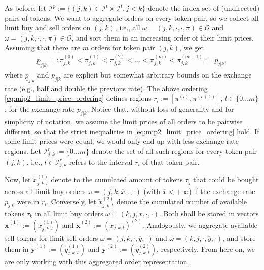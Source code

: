 \documentclass[11pt,parskip=full]{scrartcl}%
\newcommand*{\ie}{i.e., }
\newcommand*{\eg}{e.g., }
\newcommand*{\orders}{\mathcal{O}}          %
\newcommand*{\itokens}{\mathcal{I}^t}       %
\newcommand*{\itokenpairs}{\mathcal{I}^p}   %
\begin{document}
As before, let $\itokenpairs := \{(j,k) \in \itokens \times \itokens, j < k\}$ denote the index set
of (undirected) pairs of tokens.
We want to aggregate orders on every token pair, so we collect all limit buy and sell orders on
$(j,k)$, \ie all $\omega = (j,k,\cdot,\cdot,\pi) \in \orders$ and
$\omega = (j,k,\cdot,\cdot,\pi) \in \orders$, and sort them in an increasing order of
their limit prices.
Assuming that there are $m$ orders for token pair $(j,k)$, we get
\begin{align}
  \underline{p}_{j|k} =:
    \pi^{(0)}_{j,k} < \pi^{(1)}_{j,k} < \pi^{(2)}_{j,k} <
    \ldots < \pi^{(m)}_{j,k} < \pi^{(m+1)}_{j,k}
  := \overline{p}_{j|k},
  \label{eq:mip2_limit_price_ordering}
\end{align}
where $\underline{p}_{j|k}$ and $\overline{p}_{j|k}$ are explicit but somewhat arbitrary bounds
on the exchange rate (\eg half and double the previous rate).
The above ordering \eqref{eq:mip2_limit_price_ordering} defines regions
$r_l := [\pi^{(l)},\pi^{(l+1)}]$, $l \in \{0 \ldots m\}$, for the exchange rate $p_{j|k}$.
Notice that, without loss of generality and for simplicity of notation, we assume the limit prices
of all orders to be pairwise different, so that the strict inequalities in 
\eqref{eq:mip2_limit_price_ordering} hold.
If some limit prices were equal, we would only end up with less exchange rate regions.
Let $\mathcal{I}_{j,k}^r := \{0 \ldots m\}$ denote the set of all such regions for every token
pair $(j,k)$, \ie $l \in \mathcal{I}_{j,k}^r$ refers to the interval $r_l$ of that token
pair.

Now, let $\tilde{x}_{j,k,l}^{(1)}$ denote to the cumulated amount of tokens $\tau_j$ that could
be bought across all limit buy orders
$\omega = (j,k,\overline{x},\cdot,\cdot)$ (with $\overline{x} < +\infty$)
if the exchange rate $p_{j|k}$ were in $r_l$.
Conversely, let $\tilde{x}_{j,k,l}^{(2)}$ denote the cumulated number of available tokens
$\tau_k$ in all limit buy orders $\omega = (k,j,\overline{x},\cdot,\cdot)$.
Both shall be stored in vectors $\tilde{\mathbf{x}}^{(1)} := (\tilde{x}_{j,k,l}^{(1)})$ and
$\tilde{\mathbf{x}}^{(2)} := (\tilde{x}_{j,k,l})^{(2)}$.
Analogously, we aggregate available sell tokens for limit sell orders
$\omega = (j,k,\cdot,\overline{y},\cdot)$ and
$\omega = (k,j,\cdot,\overline{y},\cdot)$, and store them in
$\tilde{\mathbf{y}}^{(1)} := (\tilde{y}_{j,k,l}^{(1)})$ and
$\tilde{\mathbf{y}}^{(2)} := (\tilde{y}_{j,k,l}^{(2)})$, respectively.
From here on, we are only working with this aggregated order representation.
\end{document}
